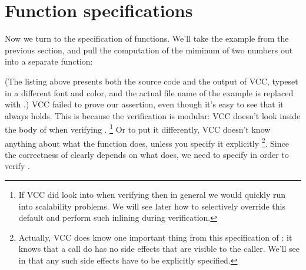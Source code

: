 \section{Function specifications}
\label{sect:functions}

Now we turn to the specification of functions. We'll take the example
from the previous section, and pull the computation of the miminum of
two numbers out into a separate function:


(The listing above presents both the source code and the output
of VCC, typeset in a different font and color, and 
the actual file name of the example is replaced with .)
VCC failed to prove our assertion, even though it's easy to see that
it always holds. This is because the verification is modular: VCC
doesn't look inside the body of  when verifying .%
\footnote{
  If VCC did look into  when verifying 
  then in general we would quickly run into scalability problems.
  We will see later how to selectively override this default and perform such inlining during verification.
}
Or to put it differently, VCC doesn't know anything about what the
 function does, unless you specify it explicitly%
\footnote{
  Actually, VCC does know one important thing from this specification
  of : it knows that a call do  has no side
  effects that are visible to the caller. We'll see in  that
  any such side effects have to be explicitly specified.
}.
Since the correctness of  clearly depends on what 
does, we need to specify  in order to verify .

